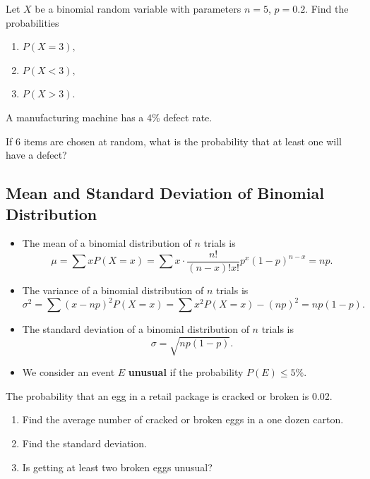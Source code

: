\begin{exercise}

Let \(X\) be a binomial random variable with parameters \(n = 5\),
\(p=0.2\). Find the probabilities

\begin{enumerate}
\item
  \(P(X=3),\)
\item
  \(P(X<3),\)
\item
  \(P(X>3).\)
\end{enumerate}

\end{exercise}

\begin{exercise}

A manufacturing machine has a 4\% defect rate.

If 6 items are chosen at random, what is the probability that at least
one will have a defect?

\end{exercise}

\hypertarget{mean-and-standard-deviation-of-binomial-distribution}{%
\subsection{Mean and Standard Deviation of Binomial
Distribution}\label{mean-and-standard-deviation-of-binomial-distribution}}

\begin{itemize}
\item
  The mean of a binomial distribution of \(n\) trials is
  \[\mu =\sum xP(X=x)=\sum x\cdot \dfrac{n!}{(n-x)!x!}p^x(1-p)^{n-x} = np.\]
\item
  The variance of a binomial distribution of \(n\) trials is
  \[\sigma^2 =\sum (x-np)^2P(X=x)=\sum x^2P(X=x)-(np)^2=np(1-p).\]
\item
  The standard deviation of a binomial distribution of \(n\) trials is
  \[\sigma=\sqrt{np(1-p)}.\]
\item
  We consider an event \(E\) \textbf{unusual} if the probability
  \(P(E)\leq 5\%\).
\end{itemize}

\begin{example}

The probability that an egg in a retail package is cracked or broken is
0.02.

\begin{enumerate}
\item
  Find the average number of cracked or broken eggs in a one dozen
  carton.
\item
  Find the standard deviation.
\item
  Is getting at least two broken eggs unusual?
\end{enumerate}

\end{example}


